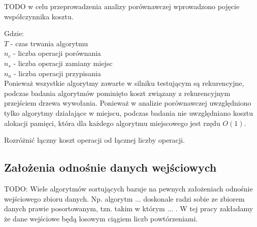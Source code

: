 TODO w celu przeprowadzenia analizy porównawczej wprowadzono pojęcie współczynnika kosztu.

Gdzie:\\
\boldmath$T$ - czas trwania algorytmu\\
$n_c$ - liczba operacji porównania\\
$n_s$ - liczba operacji zamiany miejsc\\
$n_a$ - liczba operacji przypisania\\

Ponieważ wszystkie algorytmy zawarte w silniku testującym są rekurencyjne, podczas badania algorytmów pominięto koszt związany z rekurencyjnym przejściem drzewa wywołania.
Ponieważ w analizie porównawczej uwzględniono tylko algorytmy działające w miejscu, podczas badania nie uwzględniano kosztu alokacji pamięci, która dla każdego algorytmu miejscowego jest rzędu $O(1)$.

Rozróżnić łączny koszt operacji od łącznej liczby operacji.

\subsection{Założenia odnośnie danych wejściowych}
TODO: Wiele algorytmów sortujących bazuje na pewnych założeniach odnośnie wejściowego zbioru danych.
Np. algorytm ... doskonale radzi sobie ze zbiorem danych prawie posortowanym, tzn.
takim w którym ... . W tej pracy zakładamy że dane wejściowe będą losowym ciągiem liczb powtórzeniami.
